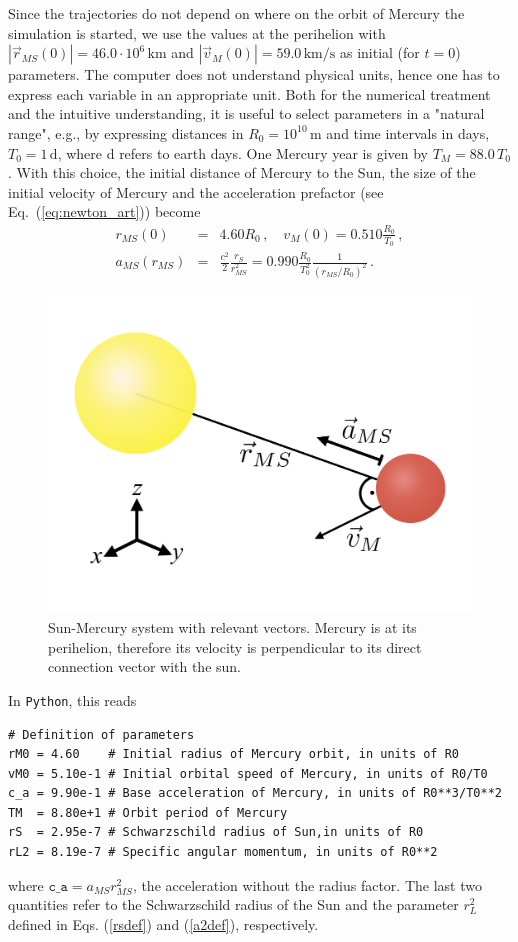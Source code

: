 \documentclass[12pt,ngerman,american]{iopart}
\newcommand{\python}[0]{\texttt{Python}}
\newcommand{\abs}[1]{\left\vert #1 \right\vert}
\begin{document}
Since the trajectories do not depend on where on the orbit of Mercury the simulation is started, we
use the values at the perihelion with $\abs{\vec r_{MS}(0)} = 46.0 \cdot 10^6\,\mathrm{km}$ and $\abs{\vec v_M(0)} = 59.0\,\mathrm{km/s}$\cite{MercuryFactSheet} as initial (for $t=0$) parameters.
The computer does not understand physical units, hence one has to express each variable in an appropriate unit.
Both for the numerical treatment and the intuitive understanding, it is useful to select parameters in a "natural range", e.g.,
by expressing distances in $R_0 = 10^{10}\,\mathrm{m}$ and time intervals in days, $T_0 = 1\,\mathrm{d}$, where d refers to earth days. One Mercury year is given by $T_M=88.0\,T_0$.
With this choice, the initial distance of Mercury to the Sun, the size of the initial velocity of Mercury and the acceleration prefactor (see Eq.~(\ref{eq:newton_art})) become
\begin{eqnarray}
r_{MS}(0)   &=& 4.60 R_0 \, , \quad
v_{M}(0)    = 0.510 \frac{R_0}{T_0} \, ,  \\
a_{MS}(r_{MS}) &=& \frac{c^2}{2}\frac{r_S}{r_{MS}^2} = 0.990 \frac{R_0}{T_0^2} \frac{1}{{\left(r_{MS}/R_0\right)}^2}\, .
\end{eqnarray}

%
\begin{figure}[htb]
	\centering
	\includegraphics[width=.5\textwidth]{figs/sun_merc.pdf}
	\caption{\label{fig:sun_merc}%
		Sun-Mercury system with relevant vectors.
		Mercury is at its perihelion, therefore its velocity is perpendicular to its direct connection vector with the sun.%
	}
\end{figure}
%

In \python{}, this reads
\begin{lstlisting}
# Definition of parameters
rM0 = 4.60    # Initial radius of Mercury orbit, in units of R0
vM0 = 5.10e-1 # Initial orbital speed of Mercury, in units of R0/T0
c_a = 9.90e-1 # Base acceleration of Mercury, in units of R0**3/T0**2
TM  = 8.80e+1 # Orbit period of Mercury
rS  = 2.95e-7 # Schwarzschild radius of Sun,in units of R0
rL2 = 8.19e-7 # Specific angular momentum, in units of R0**2
\end{lstlisting}
where $\texttt{c\_a} =a_{MS} r_{MS}^2$, the acceleration without the radius factor.
The last two quantities refer to the Schwarzschild radius of the Sun and the parameter $r_L^2$ defined in Eqs. (\ref{rsdef}) and (\ref{a2def}), respectively.
\end{document}
